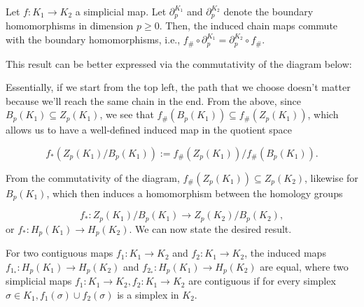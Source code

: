 \begin{lemma}
  Let $f: K_{1} \to K_{2}$ a simplicial map. Let $\partial_{p}^{K_{1}}$ and $\partial_{p}^{K_{2}}$ denote the boundary homomorphisms in dimension $p \geq 0$. Then, the induced chain maps commute with the boundary homomorphisms, i.e., $f_{\#} \circ \partial_{p}^{K_{1}} = \partial_{p}^{K_{2}} \circ f_{\#}$.
\end{lemma}

This result can be better expressed via the commutativity of the diagram below:

\begin{figure}[h]
  \centering
\end{figure}

Essentially, if we start from the top left, the path that we choose doesn't matter because we'll reach the same chain in the end. From the above, since $B_{p}(K_{1}) \subseteq Z_{p}(K_{1})$, we see that $f_{\#}(B_{p}(K_{1})) \subseteq f_{\#}(Z_{p}(K_{1}))$, which allows us to have a well-defined induced map in the quotient space

\begin{equation*}
  f_{*}(Z_{p}(K_{1})/B_{p}(K_{1})) := f_{\#}(Z_{p}(K_{1})) / f_{\#}(B_{p}(K_{1})).
\end{equation*}

From the commutativity of the diagram, $f_{\#}(Z_{p}(K_{1})) \subseteq Z_{p}(K_{2})$, likewise for $B_{p}(K_{1})$, which then induces a homomorphism between the homology groups

\begin{equation*}
  f_{*}: Z_{p}(K_{1})/B_{p}(K_{1}) \to Z_{p}(K_{2})/B_{p}(K_{2}),
\end{equation*}
or $f_{*}: H_{p}(K_{1}) \to H_{p}(K_{2})$. We can now state the desired result.

\begin{lemma}
  For two contiguous maps $f_{1}: K_{1} \to K_{2}$ and $f_{2}: K_{1} \to K_{2}$, the induced maps $f_{1_{*}}: H_{p}(K_{1}) \to H_{p}(K_{2})$ and $f_{2_{*}}: H_{p}(K_{1}) \to H_{p}(K_{2})$ are equal, where two simplicial maps $f_{1}:K_{1} \to K_{2}, f_{2}:K_{1} \to K_{2}$ are contiguous if for every simplex $\sigma \in K_{1}, f_{1}(\sigma) \cup f_{2}(\sigma)$ is a simplex in $K_{2}$.
\end{lemma}

